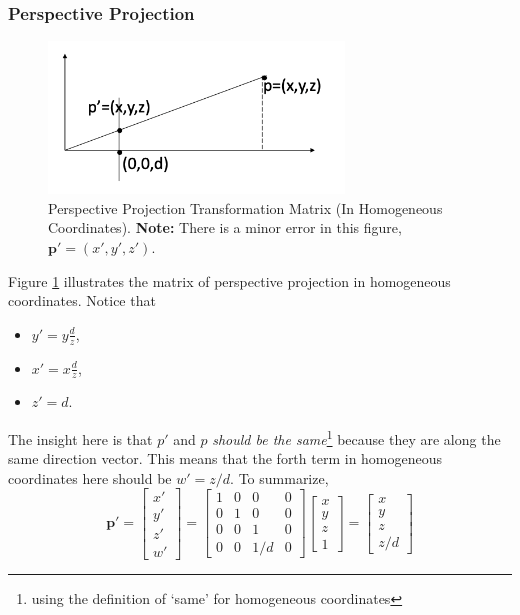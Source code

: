 \documentclass[11pt]{article}
\newcommand{\bp}{\mathbf{p}}
\begin{document}
\subsubsection{Perspective Projection}
\begin{figure}
	\centering
	\includegraphics[width=0.7\textwidth]{figs/perpective projection 3d}
	\caption{Perspective Projection Transformation Matrix (In Homogeneous Coordinates). \textbf{Note:} There is a minor error in this figure, $\bp' = (x', y', z')$. \label{fig:perspective projection 3d}}
\end{figure}
Figure \ref{fig:perspective projection 3d} illustrates the matrix of perspective projection in homogeneous coordinates. Notice that 
\begin{itemize}
	\item $y' = y \frac{d}{z}$, 
	\item $x' = x \frac{d}{z}$, 
	\item $z' = d$. 
\end{itemize}
The insight here is that $p'$ and $p$ \textit{should be the same}\footnote{using the definition of `same' for homogeneous coordinates} because they are along the same direction vector. This means that the forth term in homogeneous coordinates here should be $w' = z/d$. To summarize, 
\begin{equation}
	\bp' = \begin{bmatrix}
		x' \\ y' \\ z' \\ w'
	\end{bmatrix} = \begin{bmatrix}
		1 & 0 & 0 & 0 \\ 
		0 & 1 & 0 & 0 \\
		0 & 0 & 1 & 0 \\
		0 & 0 & 1/d & 0
	\end{bmatrix}\begin{bmatrix}
		x \\ y \\ z \\ 1
	\end{bmatrix} = \begin{bmatrix}
		x \\ y \\ z \\ z/d
	\end{bmatrix}
\end{equation}
\end{document}

